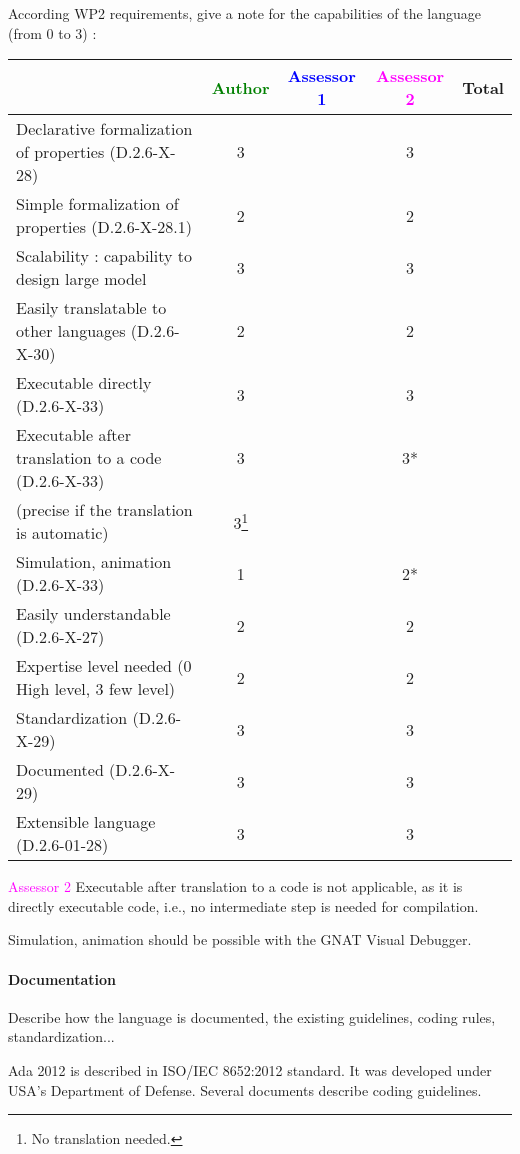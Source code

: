 According WP2 requirements, give a note for the capabilities of the language (from 0 to 3) :

\begin{tabular}{|l | c | c | c | c|}
\hline
& \textcolor{green}{Author} & \textcolor{blue}{Assessor 1} & \textcolor{magenta}{Assessor 2} & Total \\
\hline
Declarative formalization of properties (D.2.6-X-28) & 3 & & 3 & \\
\hline
Simple formalization of properties (D.2.6-X-28.1) & 2 & & 2 & \\
\hline
Scalability : capability to design large model & 3 & & 3 & \\
\hline
Easily translatable to other languages (D.2.6-X-30) & 2 & & 2 & \\
\hline
Executable directly (D.2.6-X-33) & 3 & & 3 & \\
\hline
Executable after translation to a code (D.2.6-X-33) & 3 & & 3* & \\
(precise if the translation is automatic) & 3\footnote{No translation needed.} & & & \\
\hline
Simulation, animation (D.2.6-X-33) & 1 & & 2* & \\
\hline
Easily understandable (D.2.6-X-27) & 2 & & 2 & \\
\hline
Expertise level needed (0 High level, 3 few level) & 2 & & 2 & \\
\hline
Standardization (D.2.6-X-29) & 3 & & 3 & \\
\hline
Documented (D.2.6-X-29) & 3 & & 3 & \\
\hline
Extensible language (D.2.6-01-28) & 3 & & 3 & \\
\hline
\end{tabular}

\textcolor{magenta}{Assessor 2} Executable after translation to a code is not
applicable, as it is directly executable code, i.e., no intermediate step is
needed for compilation.

Simulation, animation should be possible with the GNAT Visual Debugger.


\paragraph{Documentation} Describe how the language is documented, the existing guidelines, coding rules, standardization...

Ada 2012 is described in ISO/IEC 8652:2012 standard. It was developed
under USA's Department of Defense. Several documents describe coding
guidelines.



